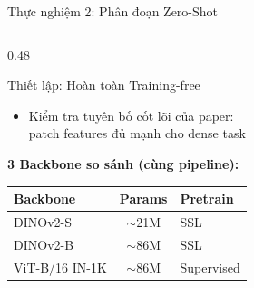 \documentclass[aspectratio=169]{beamer}
\begin{document}
\begin{frame}[t,shrink=15]{Thực nghiệm 2: Phân đoạn Zero-Shot}
\begin{columns}[t]
\begin{column}{0.48\textwidth}
\begin{exampleblock}{Thiết lập: Hoàn toàn Training-free}
\begin{itemize}
                    \item Kiểm tra tuyên bố cốt lõi của paper:\\patch features đủ mạnh cho dense task
                \end{itemize}
            \end{exampleblock}
            \vspace{0.2cm}
            \textbf{3 Backbone so sánh (cùng pipeline):}
            \vspace{0.1cm}
            \small
            \begin{tabular}{|l|c|l|}
                \hline
                \rowcolor{uetblue!15}
                \textbf{Backbone} & \textbf{Params} & \textbf{Pretrain} \\
                \hline
                DINOv2-S & $\sim$21M & SSL \\
                \hline
                DINOv2-B & $\sim$86M & SSL \\
                \hline
                ViT-B/16 IN-1K & $\sim$86M & Supervised \\
                \hline
            \end{tabular}
        \end{column}
    \end{columns}
\end{frame}
\end{document}

